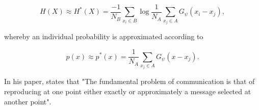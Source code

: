 \begin{equation}       
	H(X) \approx H^*(X) = \frac{-1}{N_B} \sum_{x_i \in B}{\log \frac{1}{N_A} \sum_{x_j \in A}{G_\psi(x_i - x_j)}},
\end{equation}

whereby an individual probability is approximated according to

\begin{equation}
	p(x) \approx p^*(x) = \frac{1}{N_A} \sum_{x_j \in A}{G_\psi(x - x_j)}.
\end{equation}

In his paper, \cite{shannon2001mathematical} states that "The fundamental problem of communication is that of reproducing at one point either exactly or approximately a message selected at another point".











































